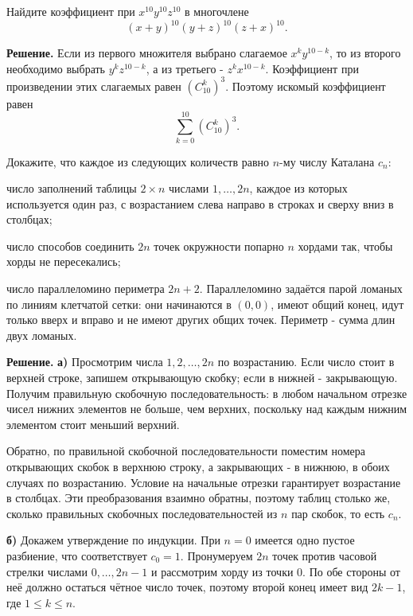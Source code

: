 \begin{problems}
\item Найдите коэффициент при $x^{10}y^{10}z^{10}$ в многочлене
\[
(x+y)^{10}(y+z)^{10}(z+x)^{10}.
\]
\par\smallskip\noindent\textbf{Решение.} Если из первого множителя выбрано слагаемое $x^ky^{10-k}$, то из второго необходимо выбрать $y^kz^{10-k}$, а из третьего - $z^kx^{10-k}$. Коэффициент при произведении этих слагаемых равен $(C_{10}^k)^3$. Поэтому искомый коэффициент равен
\[
\sum_{k=0}^{10}(C_{10}^k)^3.
\]\par

\item Докажите, что каждое из следующих количеств равно $n$-му числу Каталана $c_n$:
\begin{parts}
  \item число заполнений таблицы $2\times n$ числами $1,\ldots,2n$, каждое из которых используется один раз, с возрастанием слева направо в строках и сверху вниз в столбцах;
  \item число способов соединить $2n$ точек окружности попарно $n$ хордами так, чтобы хорды не пересекались;
  \item число параллеломино периметра $2n+2$. Параллеломино задаётся парой ломаных по линиям клетчатой сетки: они начинаются в $(0,0)$, имеют общий конец, идут только вверх и вправо и не имеют других общих точек. Периметр - сумма длин двух ломаных.
\end{parts}
\par\smallskip\noindent\textbf{Решение.} \textbf{а)} Просмотрим числа $1,2,\ldots,2n$ по возрастанию. Если число стоит в верхней строке, запишем открывающую скобку; если в нижней - закрывающую. Получим правильную скобочную последовательность: в любом начальном отрезке чисел нижних элементов не больше, чем верхних, поскольку над каждым нижним элементом стоит меньший верхний.
\par Обратно, по правильной скобочной последовательности поместим номера открывающих скобок в верхнюю строку, а закрывающих - в нижнюю, в обоих случаях по возрастанию. Условие на начальные отрезки гарантирует возрастание в столбцах. Эти преобразования взаимно обратны, поэтому таблиц столько же, сколько правильных скобочных последовательностей из $n$ пар скобок, то есть $c_n$.
\par\textbf{б)} Докажем утверждение по индукции. При $n=0$ имеется одно пустое разбиение, что соответствует $c_0=1$. Пронумеруем $2n$ точек против часовой стрелки числами $0,\ldots,2n-1$ и рассмотрим хорду из точки $0$. По обе стороны от неё должно остаться чётное число точек, поэтому второй конец имеет вид $2k-1$, где $1\le k\le n$.

\end{problems}
